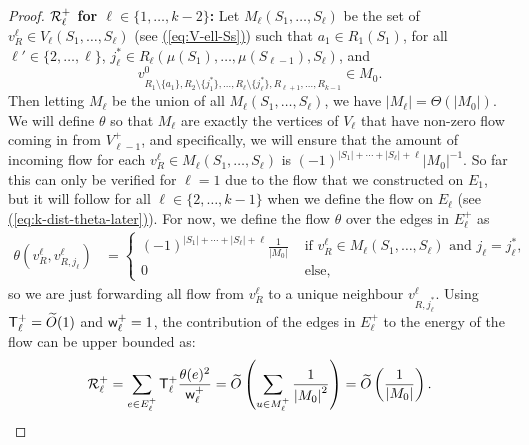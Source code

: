 \documentclass{theoretics}
\newcommand{\eq}[1]{\hyperref[eq:#1]{(\ref*{eq:#1})}}
\renewcommand{\>}{\rangle}
\newcommand{\<}{\langle}
\renewcommand{\(}{\left(}
\renewcommand{\)}{\right)}
\def\abs#1{\left| #1 \right|}
\def\w{{\sf w}}
\begin{document}
\begin{proof}
\vskip7pt
\noindent\textbf{${\cal R}_{\ell}^+$ for $\ell \in \{1,\dots,k-2\}$:} Let $M_{\ell}(S_1,\dots,S_{\ell})$ be the set of $v^{\ell}_{R}\in V_{\ell}(S_1,\dots,S_{\ell})$ (see \eq{V-ell-Ss}) such that $a_1\in R_1(S_1)$, for all $\ell'\in\{2,\dots,\ell\}$, $j_{\ell}^*\in R_{\ell}(\mu(S_1),\dots,\mu(S_{\ell-1}),S_{\ell})$, and 
$$v^0_{R_1\setminus\{a_1\},R_2\setminus\{j_1^*\},\dots,R_{\ell}\setminus\{j_{\ell}^*\},R_{\ell+1},\dots,R_{k-1}}\in M_0.$$
Then letting $M_{\ell}$ be the union of all $M_{\ell}(S_1,\dots,S_{\ell})$, we have $|M_{\ell}|=\Theta(|M_0|)$. 
We will define $\theta$ so that $M_{\ell}$ are exactly the vertices of $V_{\ell}$ that have non-zero flow coming in from $V_{\ell-1}^+$, and specifically, we will ensure that the amount of incoming flow for each $v^{\ell}_R\in M_{\ell}(S_1,\dots,S_{\ell})$ is $(-1)^{\abs{S_1} + \cdots +\abs{S_{\ell}}+\ell}{\abs{M_0}}^{-1}$. So far this can only be verified for $\ell=1$ due to the flow that we constructed on $E_1$, but it will follow for all $\ell \in \{2,\dots,k-1\}$ when we define the flow on $E_{\ell}$ (see \eq{k-dist-theta-later}). For now, we define the flow $\theta$ over the edges in $E_{\ell}^+$ as 
		\begin{align*} 
			\theta(v^{\ell}_{R},v^{\ell}_{R,j_{\ell}})
			&= \begin{cases}
				\left(-1\right)^{\abs{S_1} + \cdots + \abs{S_{\ell}}+\ell}\frac{1}{\abs{M_0}} &\text{ if } v^{\ell}_R \in M_{\ell}(S_1,\dots,S_{\ell})\text{ and } j_{\ell} = j^*_{\ell},\\
				0 &\text{ else},
			\end{cases}
		\end{align*}
so we are just forwarding all flow from $v_R^{\ell}$ to a unique neighbour $v_{R,j_{\ell}^*}^{\ell}$.		
Using ${\sf T}_{\ell}^+=\widetilde{O}(1)$ and $\w_{\ell}^+=1$, the contribution of the edges in $E_{\ell}^+$ to the energy of the flow can be upper bounded as:
		\begin{equation}
			{\cal R}_{\ell}^+ = \sum_{e\in E_{\ell}^{+}}{\sf T}_{\ell}^+\frac{\theta(e)^2}{\w_{\ell}^{+}} = \widetilde{O}\left(\sum_{u\in M_{\ell}^{+}}\frac{1}{\abs{M_0}^2}\right)=\widetilde{O}\left(\frac{1}{\abs{M_0}}\right).\label{eq:k-Rell+}
		\end{equation}


\end{proof}
\end{document}
